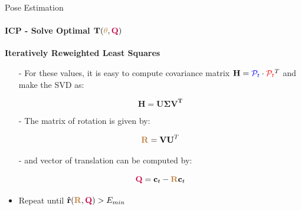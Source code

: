 \documentclass[aspectratio=169]{beamer}
\newcommand{\tikzRot}{0}
\newcommand{\tikzTrans}{(0,0)}
\newcommand{\tikzShowrobot}{0}
\newcommand{\tikzOneCenter}{0}
\begin{document}
\begin{frame}[fragile, c]{Pose Estimation}
	\framesubtitle{ICP - Solve Optimal $\mathbf{T}(\textcolor{brown}{\theta}, \textcolor{purple}{\mathbf{Q}})$}
	\textbf{Iteratively Reweighted Least Squares}

	\begin{minipage}[t]{0.5\textwidth}
			\begin{figure}
				\resizebox{0.7\textwidth}{!}{
					\renewcommand{\tikzRot}{30}
					\renewcommand{\tikzTrans}{(8,0)}
					\renewcommand{\tikzShowrobot}{0}
					\renewcommand{\tikzOneCenter}{0}
					\resizebox{0.8\textwidth}{!}{
					}
				}
		\end{figure}
	\end{minipage}
	\begin{minipage}[t]{0.5\textwidth}

	\vspace{-0.2in}
	\begin{itemize}
		\item[-] For these values, it is easy to compute covariance matrix $\mathbf{H} = \textcolor{blue}{\mathcal{P}_{t}} \cdot \textcolor{red}{\mathcal{P}_{t}}^T $ and make the SVD as:

	\vspace{-0.2in}
	\begin{equation*}
		\mathbf{H} = \mathbf{U \Sigma V^T}
	\end{equation*}

	\item[-] The matrix of rotation is given by:

	\vspace{-0.2in}
	\begin{equation*}
		\textcolor{brown}{\mathbf{R}} = \mathbf{V U}^T
	\end{equation*}

	\item[-] and vector of translation can be computed by:

	\vspace{-0.2in}
	\begin{equation*}
		\textcolor{purple}{\mathbf{Q}} = {\mathbf{c}_{t}} - \textcolor{brown}{\mathbf{R}} {\mathbf{c}_{t}}
	\end{equation*}

	\item Repeat until $\mathbf{\hat{r}}(\textcolor{brown}{\mathbf{R}}, \textcolor{purple}{\mathbf{Q}}) > E_{min}$

	\end{itemize}
	\end{minipage}
\end{frame}
\end{document}
